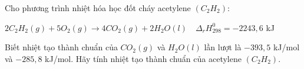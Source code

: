 \documentclass[Main.tex]{subfiles}
\begin{document}
	\begin{bt}
		Cho phương trình nhiệt hóa học đốt cháy acetylene $(C_2H_2)$:
		
		$2C_2H_2(g) + 5O_2(g) \longrightarrow 4CO_2(g) + 2H_2O(l) \quad \Delta_rH_{298}^0 = -2243{,}6$ kJ
		
		Biết nhiệt tạo thành chuẩn của $CO_2(g)$ và $H_2O(l)$ lần lượt là $-393{,}5$ kJ/mol và $-285{,}8$ kJ/mol. Hãy tính nhiệt tạo thành chuẩn của acetylene $(C_2H_2)$.
	\end{bt}
\end{document}
